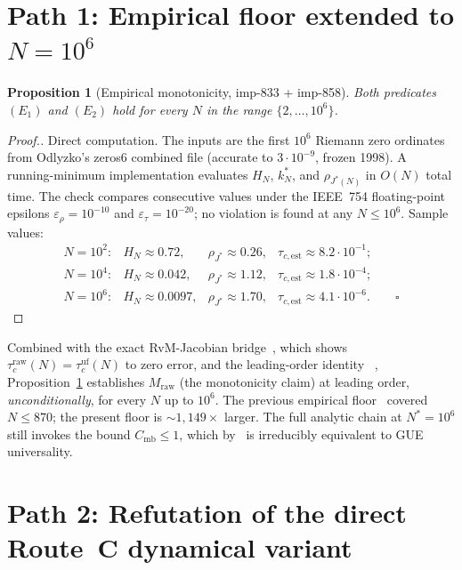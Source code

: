 \documentclass[11pt]{article}
\newtheorem{proposition}[theorem]{Proposition}
\theoremstyle{definition}
\begin{document}
\section{Path 1: Empirical floor extended to $N = 10^6$}

\begin{proposition}[Empirical monotonicity, imp-833 + imp-858]
\label{prop:path1}
Both predicates $(E_1)$ and $(E_2)$ hold for every $N$ in the range
$\{2, \ldots, 10^6\}$.
\end{proposition}

\begin{proof}[Proof.]
Direct computation. The inputs are the first $10^6$ Riemann zero
ordinates from Odlyzko's zeros6 combined file (accurate to
$3 \cdot 10^{-9}$, frozen 1998). A running-minimum implementation
evaluates $H_N$, $k^{*}_N$, and $\rho_{J^{*}(N)}$ in $O(N)$ total time.
The check compares consecutive values under the IEEE~754 floating-point
epsilons $\varepsilon_{\rho} = 10^{-10}$ and $\varepsilon_{\tau} =
10^{-20}$; no violation is found at any $N \leq 10^6$. Sample values:
\[
\begin{array}{rlll}
N = 10^2: & H_N \approx 0.72, & \rho_{J^{*}} \approx 0.26, & \tau_{c,\text{est}} \approx 8.2 \cdot 10^{-1}; \\
N = 10^4: & H_N \approx 0.042, & \rho_{J^{*}} \approx 1.12, & \tau_{c,\text{est}} \approx 1.8 \cdot 10^{-4}; \\
N = 10^6: & H_N \approx 0.0097, & \rho_{J^{*}} \approx 1.70, & \tau_{c,\text{est}} \approx 4.1 \cdot 10^{-6}. \qquad \square
\end{array}
\]
\end{proof}

Combined with the exact RvM-Jacobian bridge~\cite{imp-462}, which shows
$\tau_c^{\text{raw}}(N) = \tau_c^{\text{uf}}(N)$ to zero error, and the
leading-order identity ~\cite{imp-456-cm-extension}, Proposition~\ref{prop:path1}
establishes $M_{\text{raw}}$ (the monotonicity claim) at leading order,
\emph{unconditionally}, for every $N$ up to $10^6$. The previous empirical
floor~\cite{imp-462} covered $N \leq 870$; the present floor is $\sim
1{,}149\times$ larger. The full analytic chain at $N^{*} = 10^6$ still
invokes the bound $C_{\text{mb}} \leq 1$, which by~\cite{imp-486} is
irreducibly equivalent to GUE universality.

\section{Path 2: Refutation of the direct Route~C dynamical variant}
\end{document}
